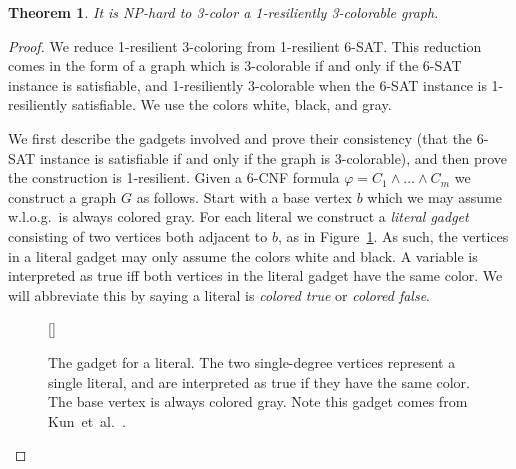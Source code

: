\documentclass{llncs}
\newtheorem{thm}{Theorem}
\begin{document}
\begin{thm}\label{thm:3-1}
It is NP-hard to 3-color a 1-resiliently 3-colorable graph.
\end{thm}
\begin{proof}
We reduce 1-resilient 3-coloring from 1-resilient 6-SAT. This reduction comes
in the form of a graph which is 3-colorable if and only if the 6-SAT instance is
satisfiable, and 1-resiliently 3-colorable when the 6-SAT instance is
1-resiliently satisfiable. We use the colors
white, black, and gray.

We first describe the gadgets involved and prove their consistency (that the
6-SAT instance is satisfiable if and only if the graph is 3-colorable), and
then prove the construction is 1-resilient. Given a 6-CNF formula $\varphi = C_1
\wedge \dots \wedge C_m$ we construct a graph $G$ as follows. Start with a base
vertex $b$ which we may assume w.l.o.g.\ is always colored
gray. For each literal we construct a \emph{literal gadget} consisting of two
vertices both adjacent to $b$, as in Figure~\ref{fig:literal-gadget}. As such,
the vertices in a literal gadget may only assume the colors white and black. A
variable is interpreted as true iff both vertices in the literal
gadget have the same color. We will abbreviate this by saying a literal is
\emph{colored true} or \emph{colored false}.


\begin{figure}
[\FBwidth]
{\caption{The gadget for a literal. The two single-degree vertices represent a
single literal, and are interpreted as true if they have the same color. The
base vertex is always colored gray. Note this gadget comes from
Kun~et~al.~\cite{KunPR13}.}
\label{fig:literal-gadget}}
{}
\end{figure}



\end{proof}
\end{document}
